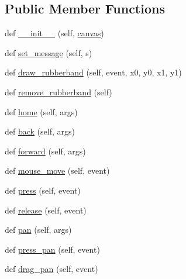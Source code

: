 \subsection*{Public Member Functions}
\begin{DoxyCompactItemize}
\item 
def \hyperlink{classmatplotlib_1_1backend__bases_1_1NavigationToolbar2_ae5aaa893e81958be2a9278406240c965}{\+\_\+\+\_\+init\+\_\+\+\_\+} (self, \hyperlink{classmatplotlib_1_1backend__bases_1_1NavigationToolbar2_a1a87a34e3a87d05f78fffea401c5a362}{canvas})
\item 
def \hyperlink{classmatplotlib_1_1backend__bases_1_1NavigationToolbar2_a0a5a900ee84ec6c45750ea3d15053057}{set\+\_\+message} (self, s)
\item 
def \hyperlink{classmatplotlib_1_1backend__bases_1_1NavigationToolbar2_a9661cc0c88bd2e8e0165a4f54f0c5156}{draw\+\_\+rubberband} (self, event, x0, y0, x1, y1)
\item 
def \hyperlink{classmatplotlib_1_1backend__bases_1_1NavigationToolbar2_a5752a93a16bf8ab1183488e37ef17832}{remove\+\_\+rubberband} (self)
\item 
def \hyperlink{classmatplotlib_1_1backend__bases_1_1NavigationToolbar2_a842a8074e9720aea2681ff7204587013}{home} (self, args)
\item 
def \hyperlink{classmatplotlib_1_1backend__bases_1_1NavigationToolbar2_af5c39cea2d1d0786fcd84e7be26211bb}{back} (self, args)
\item 
def \hyperlink{classmatplotlib_1_1backend__bases_1_1NavigationToolbar2_a1c9984d95c94792ce6f7b8b301a68d4a}{forward} (self, args)
\item 
def \hyperlink{classmatplotlib_1_1backend__bases_1_1NavigationToolbar2_a4df6c79ac6db47e8dfb02a925e207bef}{mouse\+\_\+move} (self, event)
\item 
def \hyperlink{classmatplotlib_1_1backend__bases_1_1NavigationToolbar2_a52ed6e1b62c915ba44976aca704623fd}{press} (self, event)
\item 
def \hyperlink{classmatplotlib_1_1backend__bases_1_1NavigationToolbar2_a58e3da3143ee7bcd0b784d3bcba6c168}{release} (self, event)
\item 
def \hyperlink{classmatplotlib_1_1backend__bases_1_1NavigationToolbar2_ad26e7f711f5726b0cd8a54756a703854}{pan} (self, args)
\item 
def \hyperlink{classmatplotlib_1_1backend__bases_1_1NavigationToolbar2_aa419623a8af174e67a37bd4f5f02e973}{press\+\_\+pan} (self, event)
\item 
def \hyperlink{classmatplotlib_1_1backend__bases_1_1NavigationToolbar2_ab599bc3df44950846996462676d7b9bf}{drag\+\_\+pan} (self, event)

\end{DoxyCompactItemize}
